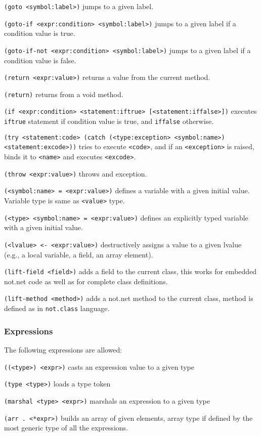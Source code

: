 {\tt (goto <symbol:label>)}
  jumps to a given label.

{\tt (goto-if <expr:condition> <symbol:label>)}
 jumps to a given label if a condition value is true.

{\tt (goto-if-not <expr:condition> <symbol:label>)}
 jumps to a given label if a condition value is false.

{\tt (return <expr:value>)} returns a value from the current method.

{\tt (return)} returns from a void method.

{\tt (if <expr:condition> <statement:iftrue> [<statement:iffalse>])}
  executes {\tt iftrue} statement if condition value is true, and {\tt iffalse} otherwise. 

{\tt (try <statement:code> (catch (<type:exception> <symbol:name>) 
      <statement:excode>))} tries to execute {\tt <code>}, and if an {\tt <exception>} is raised, binds it to {\tt <name>} and executes {\tt <excode>}.

{\tt (throw <expr:value>)} throws and exception.

{\tt (<symbol:name> = <expr:value>)} defines a variable with a given 
  initial value. Variable type is same as {\tt <value>} type.

{\tt (<type> <symbol:name> = <expr:value>)} defines an explicitly typed 
  variable with a given initial value.

{\tt (<lvalue> <- <expr:value>)} destructively assigns a value to a given lvalue (e.g., a local variable, a field, an array element).

{\tt (lift-field <field>)} adds a field to the current class, this works
  for embedded not.net code as well as for complete class definitions.

{\tt (lift-method <method>)} adds a not.net method to the current class,
  method is defined as in {\tt not.class} language.

\subsubsection{Expressions}

 The following expressions are allowed:

{\tt ((<type>) <expr>)} casts an expression value to a given type

{\tt (type <type>)} loads a type token

{\tt (marshal <type> <expr>)} marshals an expression to a given type

{\tt (arr . <*expr>)} builds an array of given elements, array type if defined
  by the most generic type of all the expressions.

